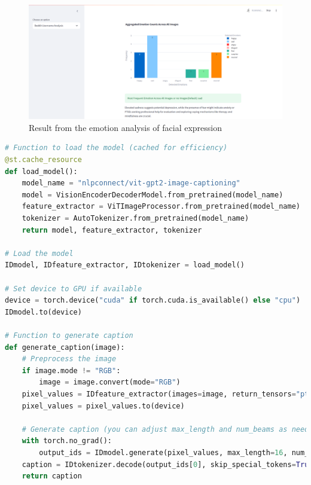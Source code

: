 \begin{figure}[h!]  
    \centering
    \includegraphics[width=1.0\textwidth]{App Images/12-1 Interface.png}  
    \caption{Result from the emotion analysis of facial expression}
    \label{10i23}  %
\end{figure}


\pagebreak

\begin{tcolorbox}[colback=gray!5!white, colframe=gray!80!black, boxrule=0.5pt, title=Image Captioning]
    \begin{lstlisting}[language=Python]
# Function to load the model (cached for efficiency)
@st.cache_resource
def load_model():
    model_name = "nlpconnect/vit-gpt2-image-captioning"
    model = VisionEncoderDecoderModel.from_pretrained(model_name)
    feature_extractor = ViTImageProcessor.from_pretrained(model_name)
    tokenizer = AutoTokenizer.from_pretrained(model_name)
    return model, feature_extractor, tokenizer

# Load the model
IDmodel, IDfeature_extractor, IDtokenizer = load_model()

# Set device to GPU if available
device = torch.device("cuda" if torch.cuda.is_available() else "cpu")
IDmodel.to(device)

# Function to generate caption
def generate_caption(image):
    # Preprocess the image
    if image.mode != "RGB":
        image = image.convert(mode="RGB")
    pixel_values = IDfeature_extractor(images=image, return_tensors="pt").pixel_values
    pixel_values = pixel_values.to(device)

    # Generate caption (you can adjust max_length and num_beams as needed)
    with torch.no_grad():
        output_ids = IDmodel.generate(pixel_values, max_length=16, num_beams=4)
    caption = IDtokenizer.decode(output_ids[0], skip_special_tokens=True)
    return caption
\end{lstlisting}
    \end{tcolorbox}

